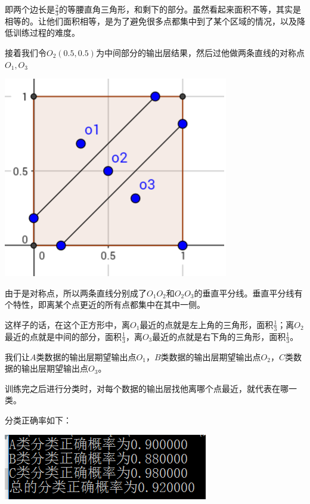 \documentclass{ctexart}
\begin{document}
即两个边长是$\frac{2}{3}$的等腰直角三角形，和剩下的部分。虽然看起来面积不等，其实是相等的。让他们面积相等，是为了避免很多点都集中到了某个区域的情况，以及降低训练过程的难度。

接着我们令$O_2(0.5,0.5)$为中间部分的输出层结果，然后过他做两条直线的对称点$O_1,O_3$

\includegraphics{1.png}

由于是对称点，所以两条直线分别成了$O_1O_2$和$O_2O_3$的垂直平分线。垂直平分线有个特性，即离某个点更近的所有点都集中在其中一侧。

这样子的话，在这个正方形中，离$O_1$最近的点就是左上角的三角形，面积$\frac{1}{3}$；离$O_2$最近的点就是中间的部分，面积$\frac{1}{3}$，离$O_3$最近的点就是右下角的三角形，面积$\frac{1}{3}$。

我们让$A$类数据的输出层期望输出点$O_1$，$B$类数据的输出层期望输出点$O_2$，$C$类数据的输出层期望输出点$O_3$。

训练完之后进行分类时，对每个数据的输出层找他离哪个点最近，就代表在哪一类。

分类正确率如下：

\includegraphics{3.png}
\end{document}
